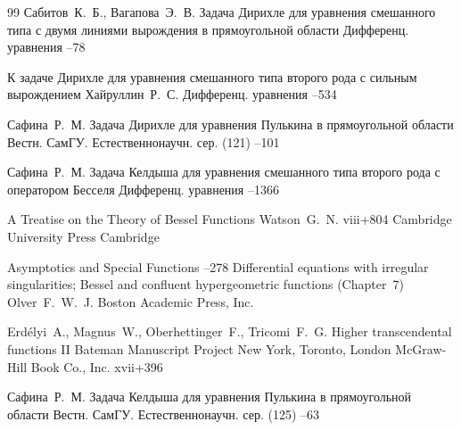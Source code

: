 \begin{thebibliography}{99}
\by Сабитов~К.~Б., Вагапова~Э.~В.
\paper Задача Дирихле для уравнения смешанного типа с двумя линиями вырождения в прямоугольной области
\jour Дифференц. уравнения
--78

\paper К задаче Дирихле для уравнения смешанного типа второго рода с сильным вырождением
\by Хайруллин~Р.~С.
\jour Дифференц. уравнения
--534

\by Сафина~Р.~М. 
\paper Задача Дирихле для уравнения Пулькина в прямоугольной области
\jour Вестн. СамГУ. Естественнонаучн. сер.
(121)
--101

\by Сафина~Р.~М. 
\paper Задача Келдыша для уравнения смешанного типа второго рода с оператором Бесселя
\jour Дифференц. уравнения
--1366


\book A Treatise on the Theory of Bessel Functions
\by  Watson~G.~N.
\totalpages viii+804
\publ Cambridge University Press
\publaddr Cambridge 


\inbook Asymptotics and Special Functions
–278
\paper Differential equations with irregular singularities; Bessel and confluent hypergeometric functions (Chapter~7)
\by  Olver~F.~W.~J.
\publaddr Boston
\publ Academic Press, Inc.


\by Erd\'elyi~A., Magnus~W., Oberhettinger~F., Tricomi~F.~G.
\book Higher transcendental functions
\bookvol II
\serial Bateman Manuscript Project
\publaddr New York, Toronto, London
\publ McGraw-Hill Book Co., Inc.
\totalpages xvii+396 

\by Сафина~Р.~М.
\paper Задача Келдыша для уравнения Пулькина в прямоугольной области
\jour Вестн. СамГУ. Естественнонаучн. сер.
(125)
--63

\end{thebibliography}

\nopagenumber

\renewcommand{\baselinestretch}{0.83}

\newpage



